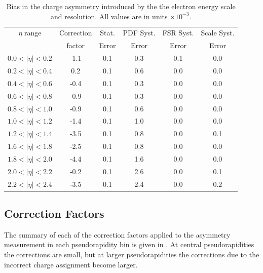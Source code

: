 \begin{table}[htbp]
  \begin{center}
    \begin{tabular}{cccccc}
\toprule
$\eta$ range & Correction  & Stat.   &PDF  Syst. &  FSR Syst. & Scale Syst.\\
          & factor & Error & Error   & Error  & Error  \\
     \midrule
 $0.0<|\eta|<0.2$ & -1.1 & 0.1 & 0.3  &0.1 & 0.0\\
 $0.2<|\eta|<0.4$ &  0.2 & 0.1 & 0.6  &0.0 & 0.0\\
 $0.4<|\eta|<0.6$ & -0.4 & 0.1 & 0.3  &0.0 & 0.0\\
 $0.6<|\eta|<0.8$ & -0.9 & 0.1 & 0.3  &0.0 & 0.0\\
 $0.8<|\eta|<1.0$ & -0.9 & 0.1 & 0.6  &0.0 & 0.0\\
 $1.0<|\eta|<1.2$ & -1.4 & 0.1 & 1.0  &0.0 & 0.0\\
 $1.2<|\eta|<1.4$ & -3.5 & 0.1 & 0.8  &0.0 & 0.1\\
 $1.6<|\eta|<1.8$ & -2.5 & 0.1 & 0.8  &0.0 & 0.0\\
 $1.8<|\eta|<2.0$ & -4.4 & 0.1 & 1.6  &0.0 & 0.0\\
 $2.0<|\eta|<2.2$ & -0.2 & 0.1 & 2.6  &0.0 & 0.1\\
 $2.2<|\eta|<2.4$ & -3.5 & 0.1 & 2.4  &0.0 & 0.2\\
\bottomrule
    \end{tabular}
    \caption{\label{tab:energyscalecorr}Bias in the charge asymmetry introduced by the the electron energy scale and resolution.
 All values are in units $\times 10^{-3}$\cite{bendavid2011electron}.}
  \end{center}
\end{table}

\subsection{Correction Factors}
The summary of each of the correction factors applied to the asymmetry
measurement in each pseudorapidity bin is given in
. At central pseudorapidities the corrections are
small, but at larger pseudorapidities the corrections due to the incorrect
charge assignment become larger.

